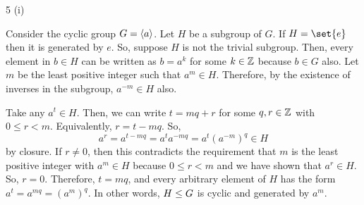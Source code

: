 \documentclass[11pt]{penrose}
\begin{document}
\begin{problem}{5 (i)}

    Consider the cyclic group $G = \langle a\rangle$. Let $H$ be a subgroup of $G$. If $H = \set{e}$ then it is generated by $e$. So, suppose $H$ is not the trivial subgroup. Then, every element in $b \in H$ can be written as $b = a^k$ for some $k \in \mathbb{Z}$ because $b \in G$ also. Let $m$ be the least positive integer such that $a^m \in H$. Therefore, by the existence of inverses in the subgroup, $a^{-m} \in H$ also.

    Take any $a^t \in H$. Then, we can write $t = mq + r$ for some $q, r \in \mathbb{Z}$ with $0 \leq r < m$. Equivalently, $r = t - mq$. So,
    \begin{equation*}
        a^r = a^{t - mq} = a^{t} a^{-mq} = a^{t} (a^{-m})^{q} \in H
    \end{equation*}
    by closure. If $r \neq 0$, then this contradicts the requirement that $m$ is the least positive integer with $a^m \in H$ because $0 \leq r < m$ and we have shown that $a^r \in H$. So, $r = 0$. Therefore, $t = mq$, and every arbitrary element of $H$ has the form $a^t = a^{mq} = (a^{m})^{q}$. In other words, $H \mathrel{\leq} G$ is cyclic and generated by $a^m$.
\end{problem}
\end{document}
